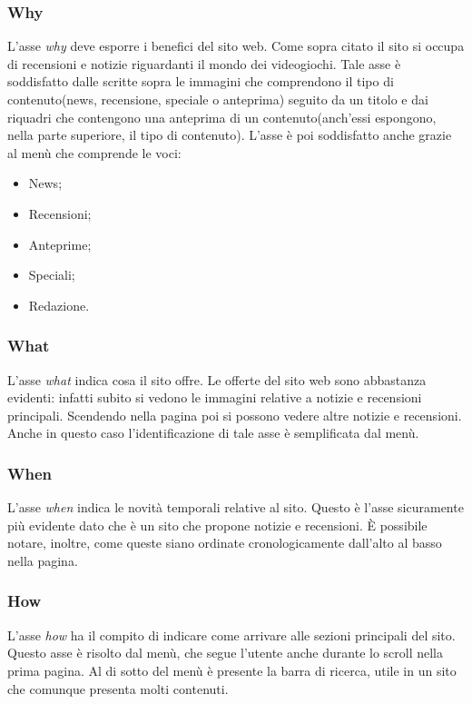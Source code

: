 \documentclass[../ProgettoTecWeb2.tex]{subfiles}
\begin{document}
		\subsubsection{Why}
			L'asse \textit{why} deve esporre i benefici del sito web. Come sopra citato il sito si occupa di recensioni e notizie riguardanti il mondo dei videogiochi. Tale asse è soddisfatto dalle scritte sopra le immagini che comprendono il tipo di contenuto(news, recensione, speciale o anteprima) seguito da un titolo e dai riquadri che contengono una anteprima di un contenuto(anch'essi espongono, nella parte superiore, il tipo di contenuto). L'asse è poi soddisfatto anche grazie al menù che comprende le voci:
			\begin{itemize}
				\item News;
				\item Recensioni;
				\item Anteprime;
				\item Speciali;
				\item Redazione.
			\end{itemize}
		\subsubsection{What}
			L'asse \textit{what} indica cosa il sito offre. Le offerte del sito web sono abbastanza evidenti: infatti subito si vedono le immagini relative a notizie e recensioni principali. Scendendo nella pagina poi si possono vedere altre notizie e recensioni. Anche in questo caso l'identificazione di tale asse è semplificata dal menù.
		\subsubsection{When}
			L'asse \textit{when} indica le novità temporali relative al sito. Questo è l'asse sicuramente più evidente dato che è un sito che propone notizie e recensioni. È possibile notare, inoltre, come queste siano ordinate cronologicamente dall'alto al basso nella pagina.
		\subsubsection{How}
			L'asse \textit{how} ha il compito di indicare come arrivare alle sezioni principali del sito. Questo asse è risolto dal menù, che segue l'utente anche durante lo scroll nella prima pagina. Al di sotto del menù è presente la barra di ricerca, utile in un sito che comunque presenta molti contenuti.
			
\end{document}
